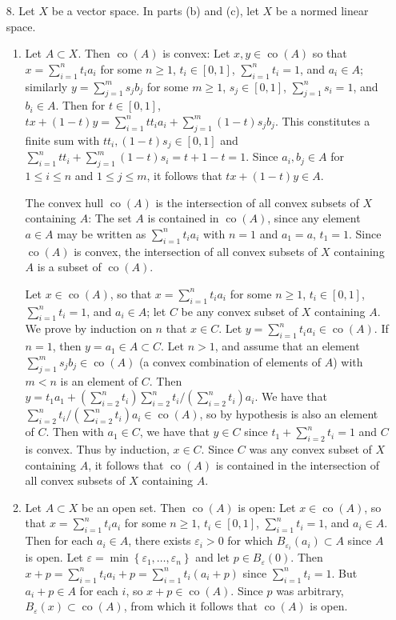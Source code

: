 \documentclass[11pt,leqno]{article}
\theoremstyle{plain}
\theoremstyle{definition}
\numberwithin{equation}{section}
\numberwithin{lem}{section}
\newcommand{\cbr}[1]{\left\{#1\right\}}
\DeclareMathOperator{\co}{co}
\begin{document}
\begin{enumerate}
  \item[8.] Let $X$ be a vector space. In parts (b) and (c), let $X$ be a normed linear space.
  \begin{enumerate}
    \item Let $A\subset X$. Then $\co(A)$ is convex: Let $x,y\in \co(A)$ so that $x = \sum_{i=1}^n t_ia_i$ for some $n\geq 1$, $t_i\in [0,1]$, $\sum_{i=1}^n t_i = 1$, and $a_i\in A$; similarly $y = \sum_{j=1}^m s_jb_j$ for some $m\geq 1$, $s_j\in [0,1]$, $\sum_{j=1}^n s_i = 1$, and $b_i\in A$. Then for $t\in [0,1]$, $tx + (1-t)y = \sum_{i=1}^n tt_ia_i + \sum_{j=1}^m (1-t)s_jb_j$. This constitutes a finite sum with $tt_i,(1-t)s_j\in [0,1]$ and $\sum_{i=1}^n tt_i + \sum_{j=1}^m (1-t)s_i = t + 1-t =1$. Since $a_i,b_j\in A$ for $1\leq i\leq n$ and $1\leq j\leq m$, it follows that $tx + (1-t)y\in A$.
    
    The convex hull $\co(A)$ is the intersection of all convex subsets of $X$ containing $A$: The set $A$ is contained in $\co(A)$, since any element $a\in A$ may be written as $\sum_{i=1}^n t_ia_i$ with $n = 1$ and $a_1 = a$, $t_1 = 1$. Since $\co(A)$ is convex, the intersection of all convex subsets of $X$ containing $A$ is a subset of $\co(A)$.
    
    Let $x\in \co(A)$, so that $x = \sum_{i=1}^n t_ia_i$ for some $n\geq 1$, $t_i\in [0,1]$, $\sum_{i=1}^n t_i = 1$, and $a_i\in A$; let $C$ be any convex subset of $X$ containing $A$. We prove by induction on $n$ that $x\in C$. Let $y = \sum_{i=1}^n t_ia_i \in \co(A)$. If $n = 1$, then $y = a_1\in A\subset C$. Let $n>1$, and assume that an element $\sum_{j=1}^ms_jb_j\in \co(A)$ (a convex combination of elements of $A$) with $m<n$ is an element of $C$. Then $y = t_1a_1 + (\sum_{i=2}^n t_i)\sum_{i=2}^{n}t_i/(\sum_{i=2}^n t_i)a_i$. We have that $\sum_{i=2}^{n}t_i/(\sum_{i=2}^n t_i)a_i\in \co(A)$, so by hypothesis is also an element of $C$. Then with $a_1\in C$, we have that $y\in C$ since $t_1 + \sum_{i=2}^n t_i = 1$ and $C$ is convex. Thus by induction, $x\in C$. Since $C$ was any convex subset of $X$ containing $A$, it follows that $\co(A)$ is contained in the intersection of all convex subsets of $X$ containing $A$.

    \item Let $A\subset X$ be an open set. Then $\co(A)$ is open: Let $x\in \co(A)$, so that $x = \sum_{i=1}^n t_ia_i$ for some $n\geq 1$, $t_i\in [0,1]$, $\sum_{i=1}^n t_i = 1$, and $a_i\in A$. Then for each $a_i\in A$, there exists $\varepsilon_i>0$ for which $B_{\varepsilon_i}(a_i)\subset A$ since $A$ is open. Let $\varepsilon = \min\cbr{\varepsilon_1,\dots,\varepsilon_n}$ and let $p\in B_\varepsilon(0)$. Then $x+p = \sum_{i=1}^n t_ia_i + p = \sum_{i=1}^n t_i(a_i + p)$ since $\sum_{i=1}^n t_i = 1$. But $a_i+ p\in A$ for each $i$, so $x+p\in \co(A)$. Since $p$ was arbitrary, $B_\varepsilon(x)\subset \co(A)$, from which it follows that $\co(A)$ is open.
    

\end{enumerate}
\end{enumerate}
\end{document}
